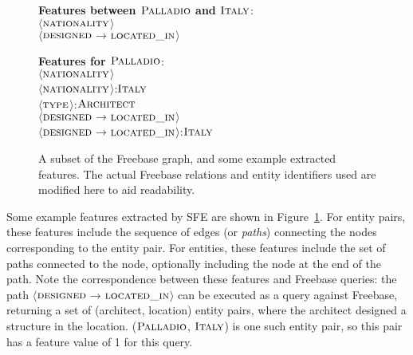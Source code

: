 \documentclass[11pt,letterpaper]{article}
\newcommand{\figref}[1]{Figure~\ref{fig:#1}}
\newcommand{\formalpredicate}[1]{{\small \ensuremath{\textsc{#1}}}}
\newcommand{\entity}[1]{\ensuremath{\textsc{#1}}}
\newcommand{\pathstart}{\ensuremath{\langle}}
\newcommand{\pathend}{\ensuremath{\rangle}}
\begin{document}
\begin{figure}
  {\center
  }

  \textbf{Features between \entity{Palladio} and \entity{Italy}}:\\
  \pathstart\formalpredicate{nationality}\pathend\\
  \pathstart\formalpredicate{designed}$\rightarrow$\formalpredicate{located\_in}\pathend

  \textbf{Features for \entity{Palladio}}:\\
  \pathstart\formalpredicate{nationality}\pathend\\
  \pathstart\formalpredicate{nationality}\pathend:\entity{Italy}\\
  \pathstart\formalpredicate{type}\pathend:\entity{Architect}\\
  \pathstart\formalpredicate{designed}$\rightarrow$\formalpredicate{located\_in}\pathend \\
  \pathstart\formalpredicate{designed}$\rightarrow$\formalpredicate{located\_in}\pathend:\entity{Italy}

  \caption{A subset of the Freebase graph, and some example extracted features.  The actual
  Freebase relations and entity identifiers used are modified here to aid readability.}
  \label{fig:sfe}
\end{figure}

Some example features extracted by SFE are shown in \figref{sfe}.  For entity pairs, these features
include the sequence of edges (or \emph{paths}) connecting the nodes corresponding to the entity
pair.  For entities, these features include the set of paths connected to the node, optionally
including the node at the end of the path.  Note the correspondence between these features and
Freebase queries: the path
\pathstart\formalpredicate{designed}$\rightarrow$\formalpredicate{located\_in}\pathend{} can be
executed as a query against Freebase, returning a set of (architect, location) entity pairs, where
the architect designed a structure in the location. (\entity{Palladio}, \entity{Italy}) is one such
entity pair, so this pair has a feature value of 1 for this query.
\end{document}
